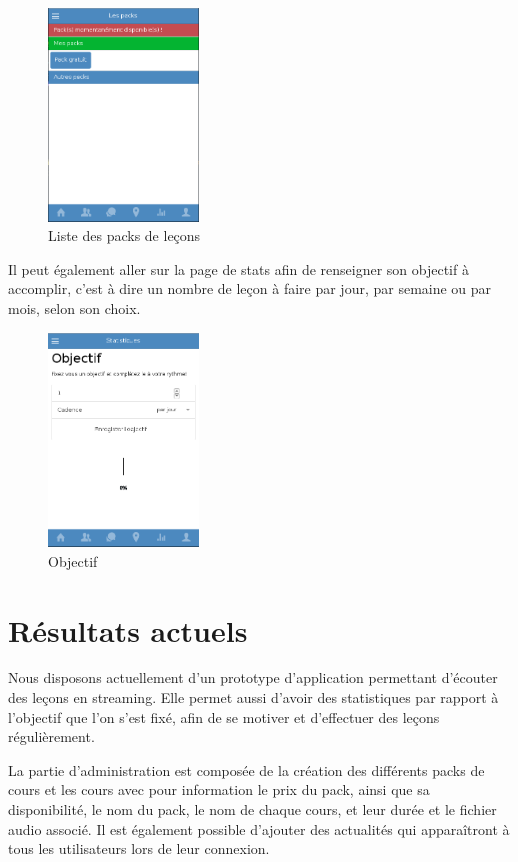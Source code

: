 \documentclass[pidr]{tnreport}
\begin{document}
\begin{figure}[h]
  \centering
  \includegraphics[width=4cm]{figures/packs}
  \caption{Liste des packs de leçons}
  \label{fig:packs}
\end{figure}
Il peut également aller sur la page de stats afin de renseigner son objectif à accomplir, c'est à dire un nombre de leçon à faire par jour, par semaine ou par mois, selon son choix.

\begin{figure}[h]
  \centering
  \includegraphics[width=4cm]{figures/stats}
  \caption{Objectif}
  \label{fig:stats}
\end{figure}
\newpage

\section{Résultats actuels}

Nous disposons actuellement d’un prototype d’application permettant d’écouter des leçons en streaming. Elle permet aussi d’avoir des statistiques par rapport à l’objectif que l’on s’est fixé, afin de se motiver et d’effectuer des leçons régulièrement.

La partie d’administration est composée de la création des différents packs de cours et les cours avec pour information le prix du pack, ainsi que sa disponibilité, le nom du pack, le nom de chaque cours, et leur durée et le fichier audio associé. Il est également possible d’ajouter des actualités qui apparaîtront à tous les utilisateurs lors de leur connexion.
\end{document}

